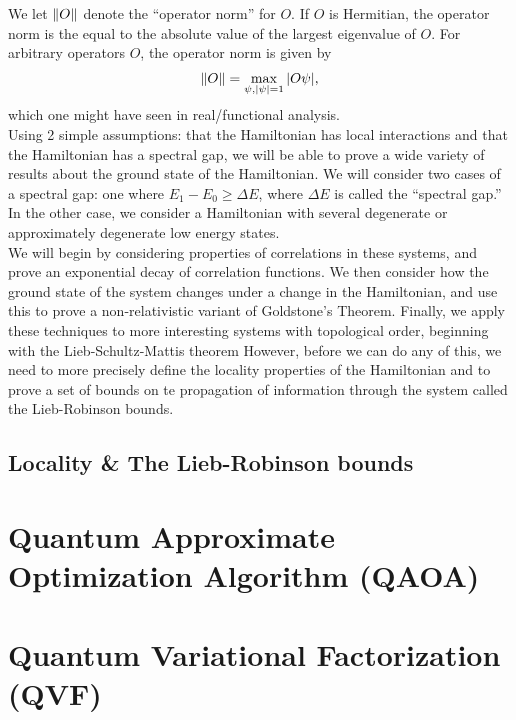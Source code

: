 \documentclass{book}
\theoremstyle{definition}
\begin{document}
We let $\norm{O}$ denote the ``operator norm'' for $O$. If $O$ is Hermitian, the operator norm is the equal to the absolute value of the largest eigenvalue of $O$. For arbitrary operators $O$, the operator norm is given by
\begin{align}
\norm{O} = \max_{\psi, \abs{\psi} = 1}  \abs{O \psi},
\end{align}
which one might have seen in real/functional analysis. \\

Using 2 simple assumptions: that the Hamiltonian has local interactions and that the Hamiltonian has a spectral gap, we will be able to prove a wide variety of results about the ground state of the Hamiltonian. We will consider two cases of a spectral gap: one where $E_1  - E_0 \geq \Delta E$, where $\Delta E$ is called the ``spectral gap.'' In the other case, we consider a Hamiltonian with several degenerate or approximately degenerate low energy states. \\

We will begin by considering properties of correlations in these systems, and prove an exponential decay of correlation functions. We then consider how the ground state of the system changes under a change in the Hamiltonian, and use this to prove a non-relativistic variant of Goldstone's Theorem. Finally, we apply these techniques to more interesting systems with topological order, beginning with the Lieb-Schultz-Mattis theorem However, before we can do any of this, we need to more precisely define the locality properties of the Hamiltonian and to prove a set of bounds on te propagation of information through the system called the Lieb-Robinson bounds. 



\subsection{Locality \& The Lieb-Robinson bounds}








\newpage


\section{Quantum Approximate Optimization Algorithm (QAOA)}

\newpage

\section{Quantum Variational Factorization (QVF)}
\end{document}
